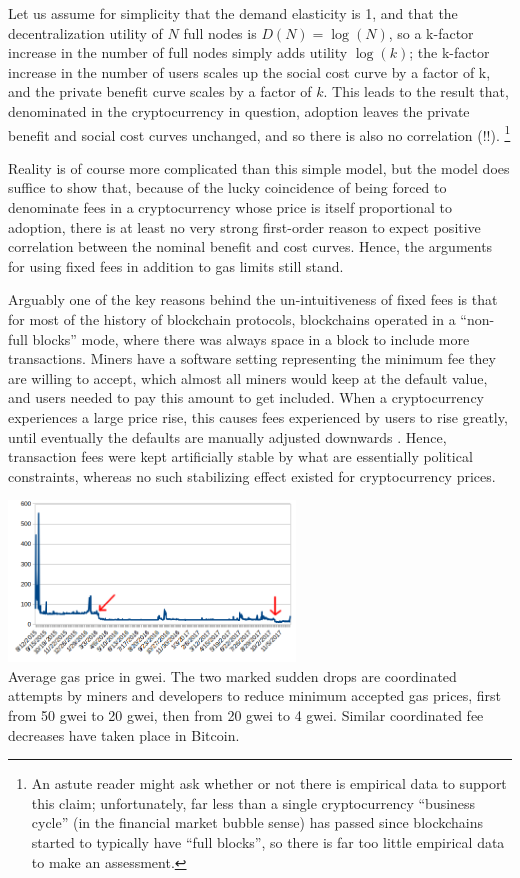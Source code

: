 \documentclass[12pt, final]{article}
\begin{document}
Let us assume for simplicity that the demand elasticity is 1, and that the decentralization utility of $N$ full nodes is $D(N) = \log(N)$, so a k-factor increase in the number of full nodes simply adds utility $\log(k)$; the k-factor increase in the number of users scales up the social cost curve by a factor of k, and the private benefit curve scales by a factor of $k$. This leads to the result that, denominated in the cryptocurrency in question, adoption leaves the private benefit and social cost curves unchanged, and so there is also no correlation (!!). \footnote{An astute reader might ask whether or not there is empirical data to support this claim; unfortunately, far less than a single cryptocurrency ``business cycle'' (in the financial market bubble sense) has passed since blockchains started to typically have ``full blocks'', so there is far too little empirical data to make an assessment.}

Reality is of course more complicated than this simple model, but the model does suffice to show that, because of the lucky coincidence of being forced to denominate fees in a cryptocurrency whose price is itself proportional to adoption, there is at least no very strong first-order reason to expect positive correlation between the nominal benefit and cost curves. Hence, the arguments for using fixed fees in addition to gas limits still stand.

Arguably one of the key reasons behind the un-intuitiveness of fixed fees is that for most of the history of blockchain protocols, blockchains operated in a ``non-full blocks'' mode, where there was always space in a block to include more transactions. Miners have a software setting representing the minimum fee they are willing to accept, which almost all miners would keep at the default value, and users needed to pay this amount to get included. When a cryptocurrency experiences a large price rise, this causes fees experienced by users to rise greatly, until eventually the defaults are manually adjusted downwards \cite{coindesk-btc-txn-fee, reddit-rec-miners, vitalik-twitter1}.  Hence, transaction fees were kept artificially stable by what are essentially political constraints, whereas no such stabilizing effect existed for cryptocurrency prices.

\begin{center}
\includegraphics[width=3in]{GaspriceInGwei.png} \\
\scriptsize{Average gas price in gwei. The two marked sudden drops are coordinated attempts by miners and developers to reduce minimum accepted gas prices, first from 50 gwei to 20 gwei, then from 20 gwei to 4 gwei. Similar coordinated fee decreases have taken place in Bitcoin\cite{btcfeesdown10x}.}
\end{center}
\end{document}
